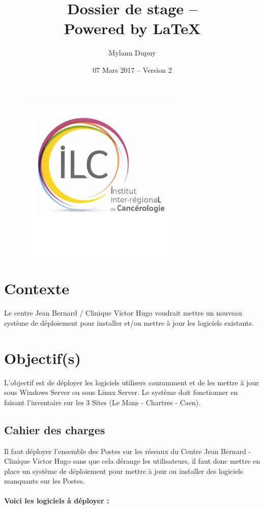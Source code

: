 \documentclass[11pt,a4paper,oneside]{article}
\author{Mylann Dupuy}
\title{Dossier de stage --  \\ Powered by \LaTeX}
\date{07 Mars 2017 -- Version 2}
\begin{document}
\maketitle
\begin{figure}[hbtp]
\centering
\includegraphics[scale=1]{Script/cjb.jpg}
\end{figure}
\newpage
\tableofcontents
\newpage
\setcounter{page}{3}
\section{Contexte}
Le centre Jean Bernard / Clinique Victor Hugo voudrait mettre un nouveau système de déploiement pour installer et/ou mettre à jour les logiciels existants.

\section{Objectif(s)}
L'objectif est de déployer les logiciels utilisers couramment et de les mettre à jour sous Windows Server ou sous Linux Server. Le système doit fonctionner en faisant l'inventaire sur les 3 Sites (Le Mans - Chartres - Caen). 

\subsection{Cahier des charges}
Il faut déployer l'ensemble des Postes sur les réseaux du Centre Jean Bernard - Clinique Victor Hugo sans que cela dérange les utilisateurs, il faut donc mettre en place un système de déploiement pour mettre à jour ou installer des logiciels manquants sur les Postes.\\ \\
\textbf{Voici les logiciels à déployer :}\\
\end{document}
